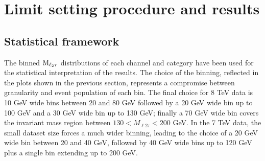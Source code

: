 \begin{table}
\caption{%
Expected event yields for the different background processes and for a 125 GeV WH, $\rm{H}\To\tau\tau$ signal compared to the number of events observed in the data, split by channel and category, for 7 TeV data. The uncertainty quoted in each background process represents statistical plus systematic uncertainty.}

\label{tab:prefit_yields_table_7TeV}
\end{table}


\section{Limit setting procedure and results}

\subsection{Statistical framework}
The binned $\rm{M}_{\ell_2 \tau}$ distributions of each channel and category have been used for the statistical interpretation of the results. The choice of the binning, reflected in the plots shown in the previous section, represents a compromise between granularity and event population of each bin. The final choice for 8 TeV data is 10 GeV wide bins between 20 and 80 GeV followed by a 20 GeV wide bin up to 100 GeV and a 30 GeV wide bin up to 130 GeV; finally a 70 GeV wide bin covers the invariant mass region between $130 < M_{\ell 2 \tau} < 200$ GeV. In the 7 TeV data, the small dataset size forces a much wider binning, leading to the choice of a 20 GeV wide bin between 20 and 40 GeV, followed by 40 GeV wide bins up to 120 GeV plus a single bin extending up to 200 GeV.




